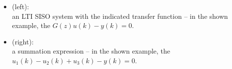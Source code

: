 \begin{frame}
\myPause
\begin{center}
 
\end{center} \myPause
\begin{itemize}[<+-| alert@+>]
\item {} (left):\\
      an LTI SISO system with the indicated transfer function -- in the shown\\
      example, the  $G(z)u(k)-y(k)=0$.
\item {} (right):\\
      a summation expression -- in the shown example, the 
      $u_1(k)-u_2(k)+u_3(k)-y(k)=0$.
\end{itemize}
\end{frame}

